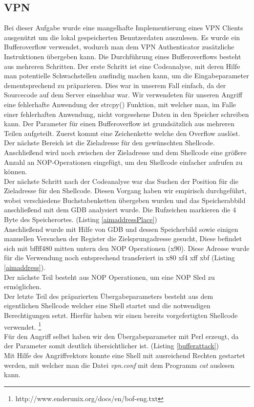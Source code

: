 \documentclass[12pt]{article}
\begin{document}
\subsection{VPN}
Bei dieser Aufgabe wurde eine mangelhafte Implementierung eines VPN Clients ausgenützt um die lokal gespeicherten Benutzerdaten auszulesen. Es wurde ein Bufferoverflow verwendet, wodurch man dem VPN Authenticator zusätzliche Instruktionen übergeben kann. Die Durchführung eines Bufferoverflows besteht aus mehreren Schritten. Der erste Schritt ist eine Codeanalyse, mit deren Hilfe man potentielle Schwachstellen ausfindig machen kann, um die Eingabeparameter dementsprechend zu präparieren. Dies war in unserem Fall einfach, da der Sourcecode auf dem Server einsehbar war. Wir verwendeten für unseren Angriff eine fehlerhafte Anwendung der strcpy() Funktion, mit welcher man, im Falle einer fehlerhaften Anwendung, nicht vorgesehene Daten in den Speicher schreiben kann. Der Parameter für einen Bufferoverflow ist grundsätzlich aus mehreren Teilen aufgeteilt. Zuerst kommt eine Zeichenkette welche den Overflow auslöst. Der nächste Bereich ist die Zieladresse für den gewünschten Shellcode. Anschließend wird noch zwischen der Zieladresse und dem Shellcode eine größere Anzahl an NOP-Operationen eingefügt, um den Shellcode einfacher aufrufen zu können.\\
Der nächste Schritt nach der Codeanalyse war das Suchen der Position für die Zieladresse für den Shellcode. Diesen Vorgang haben wir empirisch durchgeführt, wobei verschiedene Buchstabenketten übergeben wurden und das Speicherabbild anschließend mit dem GDB analysiert wurde. Die Rufzeichen markieren die 4 Byte des Speicherortes. (Listing \ref{aimaddressPlace}) \\
Anschließend wurde mit Hilfe von GDB und dessen Speicherbild sowie einigen manuellen Versuchen der Register die Zielsprungadresse gesucht, Diese befindet sich mit bffff480 mitten untern den NOP Operationen (x90). Diese Adresse wurde für die Verwendung noch entsprechend transferiert in x80 xf4 xff xbf (Listing \ref{aimaddress}). \\
Der nächste Teil besteht aus NOP Operationen, um eine NOP Sled zu ermöglichen. \\
Der letzte Teil des präparierten Übergabeparameters besteht aus dem eigentlichen Shellcode welcher eine Shell startet und die notwendigen Berechtigungen setzt. Hierfür haben wir einen bereits vorgefertigten Shellcode verwendet. \footnote{http://www.enderunix.org/docs/en/bof-eng.txt} \\
Für den Angriff selbst haben wir den Übergabeparameter mit Perl erzeugt, da der Parameter somit deutlich übersichtlicher ist. (Listing \ref{bufferattack}) \\ 
Mit Hilfe des Angriffvektors konnte eine Shell mit ausreichend Rechten gestartet werden, mit welcher man die Datei \emph{vpn.conf} mit dem Programm \emph{cat} auslesen kann.
\end{document}
